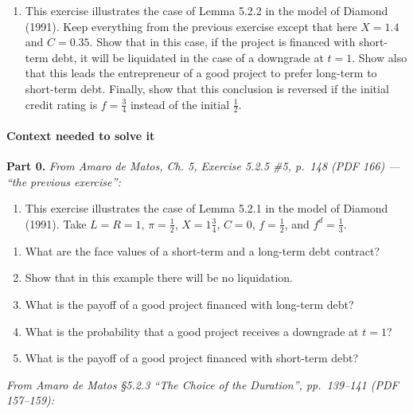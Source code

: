 \documentclass[11pt,a4paper]{article}
\providecommand{\tightlist}{\setlength{\itemsep}{0pt}\setlength{\parskip}{0pt}}
\begin{document}
\begin{enumerate}
\def\labelenumi{\arabic{enumi}.}
\setcounter{enumi}{5}
\tightlist
\item
  This exercise illustrates the case of Lemma 5.2.2 in the model of Diamond (1991). Keep everything
  from the previous exercise except that here \(X = 1.4\) and \(C = 0.35\). Show that in this case,
  if the project is financed with short-term debt, it will be liquidated in the case of a downgrade
  at \(t = 1\). Show also that this leads the entrepreneur of a good project to prefer long-term to
  short-term debt. Finally, show that this conclusion is reversed if the initial credit rating is
  \(f = \frac{3}{4}\) instead of the initial \(\frac{1}{2}\).
\end{enumerate}

\paragraph{Context needed to solve it}

\textbf{Part 0.} \emph{From Amaro de Matos, Ch. 5, Exercise 5.2.5 \#5, p.~148 (PDF 166) --- ``the
previous exercise'':}

\begin{enumerate}
\def\labelenumi{\arabic{enumi}.}
\setcounter{enumi}{4}
\tightlist
\item
  This exercise illustrates the case of Lemma 5.2.1 in the model of Diamond (1991). Take
  \(L = R = 1\), \(\pi = \frac{1}{2}\), \(X = 1\frac{3}{4}\), \(C = 0\), \(f = \frac{1}{2}\), and
  \(f^d = \frac{1}{3}\).
\end{enumerate}

\begin{enumerate}
\def\labelenumi{(\alph{enumi})}
\item
  What are the face values of a short-term and a long-term debt contract?
\item
  Show that in this example there will be no liquidation.
\item
  What is the payoff of a good project financed with long-term debt?
\item
  What is the probability that a good project receives a downgrade at \(t = 1\)?
\item
  What is the payoff of a good project financed with short-term debt?
\end{enumerate}

\emph{From Amaro de Matos §5.2.3 ``The Choice of the Duration'', pp.~139--141 (PDF 157--159):}
\end{document}
